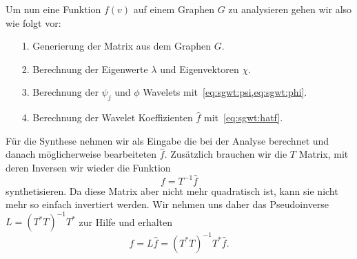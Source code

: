 Um nun eine Funktion $f(v)$ auf einem Graphen $G$ zu analysieren gehen wir 
also wie folgt vor:
\begin{itemize}
    \item[1.] Generierung der \laplaceL{} Matrix aus dem Graphen $G$.
    \item[2.] Berechnung der Eigenwerte $\lambda$ und Eigenvektoren $\chi$.
    \item[3.] Berechnung der $\psi_j$ und $\phi$ Wavelets 
    mit~\cref{eq:sgwt:psi,eq:sgwt:phi}.
    \item[4.] Berechnung der Wavelet Koeffizienten $\hat{f}$ 
    mit~\cref{eq:sgwt:hatf}.
\end{itemize}

F\"ur die Synthese nehmen wir als Eingabe die bei der Analyse berechnet und 
danach m\"oglicherweise bearbeiteten $\hat{f}$. Zus\"atzlich brauchen wir die 
$T$ Matrix, mit deren Inversen wir wieder die Funktion
\begin{equation}
f = T^{-1} \hat{f}
\end{equation}
synthetisieren. Da diese Matrix aber nicht mehr quadratisch ist, kann sie nicht 
mehr so einfach invertiert werden. Wir nehmen uns daher das Pseudoinverse $L = 
(T^*T)^{-1}T^*$ zur Hilfe und erhalten
\begin{equation}
f = L \hat{f} = (T^*T)^{-1}T^* \hat{f}.
\end{equation}
